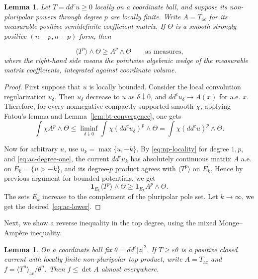 \documentclass[reqno]{amsart}
\numberwithin{equation}{section}
\newtheorem{lemma}[theorem]{Lemma}
\theoremstyle{definition}
\newcommand{\ddc}{dd^c}
\begin{document}
\begin{lemma}\label{lem:ac-lower}
Let $T=dd^cu\geq0$ locally on a coordinate ball, and suppose its non-pluripolar powers through degree $p$ are locally finite. Write $A=T_{\mathrm{ac}}$ for its measurable positive semidefinite coefficient matrix. If $\Theta$ is a smooth strongly positive $(n-p,n-p)$-form, then

\begin{equation}\label{eq:ac-lower}
\langle T^{p}\rangle\wedge\Theta
\geq A^p\wedge\Theta\qquad \text{as measures,}
\end{equation}
where the right-hand side means the pointwise algebraic wedge of the measurable matrix coefficients, integrated against coordinate volume.
\end{lemma}
\begin{proof}
    First suppose that $u$ is locally bounded. Consider the local convolution regularization $u_\delta$. Then $u_\delta$ decrease to $u$ as $\delta\downarrow0$, and $\ddc u_\delta\to A(x)$ for a.e. $x$. Therefore, for every nonnegative compactly supported smooth $\chi$, applying Fatou's lemma and Lemma~\ref{lem:bt-convergence}, one gets \[
    \int\chi A^p\wedge\Theta\leq \liminf_{\delta\downarrow 0}\int\chi(\ddc u_\delta)^p\wedge\Theta=\int\chi(\ddc u)^p\wedge\Theta.
    \]

    Now for arbitrary $u$, use $u_k=\max\{u,-k\}$. By \eqref{eq:np-locality} for degree $1,p$, and \eqref{eq:ac-degree-one}, the current $\ddc u_k$ has absolutely continuous matrix $A$ a.e. on $E_k=\{u>-k\}$, and its degree-$p$ product agrees with $\langle T^p\rangle$ on $E_k$. Hence by previous argument for bounded potentials, we get \[
    \mathbf1_{E_k}\langle T^p\rangle\wedge\Theta\geq \mathbf1_{E_k}A^p\wedge\Theta.
    \]
    The sets $E_k$ increase to the complement of the pluripolar pole set. Let $k\to \infty$, we get the desired~\eqref{eq:ac-lower}.
    
\end{proof}

Next, we show a reverse inequality in the top degree, using the mixed Monge--Amp\`ere inequality.
\begin{lemma}\label{lem:ac-upper}
On a coordinate ball fix $\theta=dd^c|z|^2$. If $T\geq\varepsilon\theta$ is a positive closed current with locally finite non-pluripolar top product, write $A=T_{\mathrm{ac}}$ and $f=\langle T^n\rangle_{\mathrm{ac}}/\theta^n$.
Then $f\leq\det A$ almost everywhere. 
\end{lemma}
\end{document}
